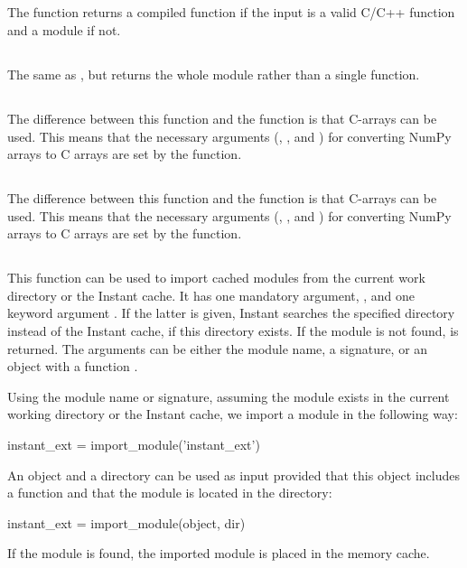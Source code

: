\subsection[inline]{}
The function  returns a compiled function if the input is a valid C/C++ function 
and a module if not.  

\subsection[inline\_module]{}
The same as , but returns the whole module rather than a single
function.

\subsection[inline\_with\_numpy]{}
The difference between this function and the  function is that
C-arrays can be used. This means that the necessary arguments
(, , and ) for converting
NumPy arrays to C arrays are set by the function.

\subsection[inline\_module\_with\_numpy]{}
The difference between this function and the  function is
that C-arrays can be used.  This means that the necessary arguments
(, , and ) for converting
NumPy arrays to C arrays are set by the function.


\subsection[import\_module]{}
This function can be used to import cached modules from the current work
directory or the Instant cache. It has one mandatory argument,
, and one keyword argument . If the latter is
given, Instant searches the specified directory instead of the Instant cache,
if this directory exists. If the module is
not found,  is returned. The 
arguments can be either the module name, a signature, or an object
with a function .

Using the module name or signature, assuming the module 
exists in the current working directory or the Instant cache, we import a
module in the following way:
\begin{code}
instant_ext = import_module('instant_ext')
\end{code}
An object and a directory can be used as input provided that this object includes a
function  and that the module is located in the
directory:
\begin{code}
instant_ext = import_module(object, dir)
\end{code}
If the module is found, the imported module is placed in the memory cache.

